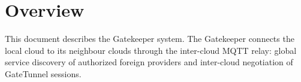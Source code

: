 \documentclass[a4paper]{arrowhead}
\begin{document}
\sloppy

\ArrowheadSetup

\begin{center}
  \vspace*{1cm}
  \huge{\arrowtitle}

  \vspace*{0.2cm}
  \LARGE{\arrowtype}
  \vspace*{1cm}

  \vspace*{\fill}


  \vspace*{1cm}
  \vspace*{\fill}

  \begin{abstract}
    This document describes the Gatekeeper support system of the Eclipse Arrowhead 5.2.2 framework, as implemented in \texttt{ah5-Gatekeeper-java-spring} with an independent local-cloud deployment definition in its own folder.
  \end{abstract}

  \vspace*{1cm}
\end{center}

\newpage

\tableofcontents
\newpage

\section{Overview}
\label{sec:overview}

This document describes the Gatekeeper system. The Gatekeeper connects the local cloud to its neighbour clouds through the inter-cloud MQTT relay: global service discovery of authorized foreign providers and inter-cloud negotiation of GateTunnel sessions.
\end{document}
